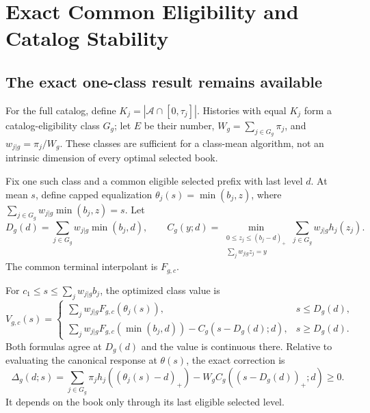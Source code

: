 \section{Exact Common Eligibility and Catalog Stability}\label{sec:robust52}
\subsection{The exact one-class result remains available}
For the full catalog, define $K_j=|\mathcal A\cap[0,\tau_j]|$. Histories with equal $K_j$ form a catalog-eligibility class $G_g$; let $E$ be their number, $W_g=\sum_{j\in G_g}\pi_j$, and $w_{j|g}=\pi_j/W_g$. These classes are sufficient for a class-mean algorithm, not an intrinsic dimension of every optimal selected book.

Fix one such class and a common eligible selected prefix with last level $d$. At mean $s$, define capped equalization $\theta_j(s)=\min(b_j,z)$, where $\sum_{j\in G_g}w_{j|g}\min(b_j,z)=s$. Let
\[
 D_g(d)=\sum_{j\in G_g}w_{j|g}\min(b_j,d),\qquad
 C_g(y;d)=\min_{\substack{0\leq z_j\leq(b_j-d)_+\\\sum_jw_{j|g}z_j=y}}\sum_{j\in G_g}w_{j|g}h_j(z_j).
\]
The common terminal interpolant is $F_{g,c}$.
\begin{proposition}\label{prop:pool52}
For $c_1\leq s\leq\sum_jw_{j|g}b_j$, the optimized class value is
\begin{equation}\label{eq:pool52}
 V_{g,c}(s)=
 \begin{cases}
 \sum_jw_{j|g}F_{g,c}(\theta_j(s)),&s\leq D_g(d),\\
 \sum_jw_{j|g}F_{g,c}(\min(b_j,d))-C_g(s-D_g(d);d),&s\geq D_g(d).
 \end{cases}
\end{equation}
Both formulas agree at $D_g(d)$ and the value is continuous there. Relative to evaluating the canonical response at $\theta(s)$, the exact correction is
\begin{equation}\label{eq:delta52}
 \Delta_g(d;s)=\sum_{j\in G_g}\pi_jh_j((\theta_j(s)-d)_+)-W_gC_g((s-D_g(d))_+;d)\geq0.
\end{equation}
It depends on the book only through its last eligible selected level.
\end{proposition}
